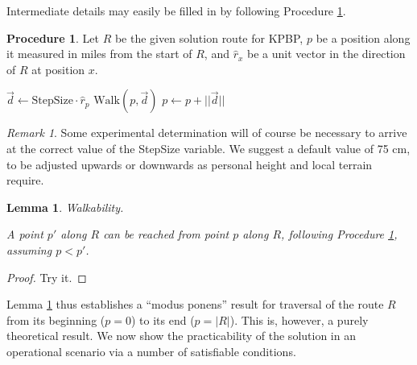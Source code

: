\documentclass[twocolumn]{article}
\theoremstyle{plain}  %
\newtheorem{lemma}{Lemma}
\theoremstyle{definition}  %
\newtheorem{proc}{Procedure}
\theoremstyle{remark}  %
\newtheorem{rem}{Remark}
\begin{document}
Intermediate details may easily be filled in by following Procedure \ref{Proc-Walk}.

\begin{proc} \label{Proc-Walk}
Let $R$ be the given solution route for KPBP, $p$ be a position along it measured in miles from the start of $R$, and $\hat{r}_x$ be a unit vector in the direction of $R$ at position $x$.
\begin{algorithmic}
    \State $\vec{d} \gets \mathrm{StepSize} \cdot \hat{r}_p$
    \State $\mathrm{Walk}(p, \vec{d})$
    \State $p \gets p + ||\vec{d}||$
\EndWhile
\end{algorithmic}
\end{proc}

\begin{rem}
Some experimental determination will of course be necessary to arrive at the correct value of the StepSize variable.  We suggest a default value of 75 cm, to be adjusted upwards or downwards as personal height and local terrain require.
\end{rem}

\begin{lemma} \label{Lemma-Walk}
Walkability.

A point $p'$ along $R$ can be reached from point $p$ along $R$, following Procedure \ref{Proc-Walk}, assuming $p < p'$.

\end{lemma}
\begin{proof}
	Try it.
\end{proof}

Lemma \ref{Lemma-Walk} thus establishes a ``modus ponens'' result for traversal of the route $R$ from its beginning ($p = 0$) to its end ($p = |R|$).  This is, however, a purely theoretical result.  We now show the practicability of the solution in an operational scenario via a number of satisfiable conditions.
\end{document}
